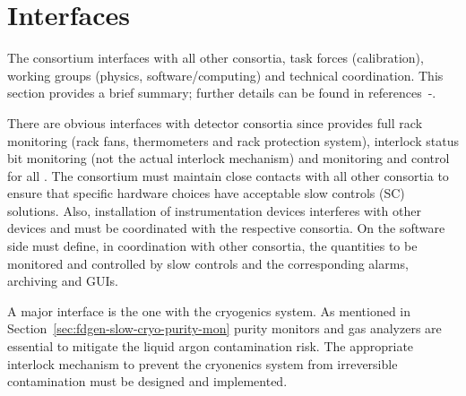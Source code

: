 \section{Interfaces}
\label{sec:fdgen-slow-cryo-intfc}


The  consortium interfaces with all other consortia, task forces (calibration), working groups (physics, software/computing) and technical coordination.
This section provides a brief summary; further details can be found in references~\cite{bib:docdb6745}-\cite{bib:docdb7018}.

There are obvious interfaces with detector consortia since  provides full rack monitoring (rack fans, thermometers and rack protection system),
interlock status bit monitoring (not the actual interlock mechanism) and monitoring and control for all \pwrsupps. The   consortium must maintain close contacts with all other consortia to ensure that specific hardware choices have acceptable slow controls (SC)  solutions.  
Also, installation of instrumentation devices interferes with other devices and must be coordinated with the respective consortia.  
On the software side  must define, in coordination with other consortia, the quantities to be monitored and controlled by slow controls and the corresponding alarms,
archiving and GUIs. 



A major interface is the one with the cryogenics system. As mentioned in Section~\ref{sec:fdgen-slow-cryo-purity-mon} purity monitors and gas analyzers are essential
to mitigate the liquid argon contamination risk. The appropriate interlock mechanism to prevent the cryonenics system from irreversible contamination
must be designed and implemented. 

